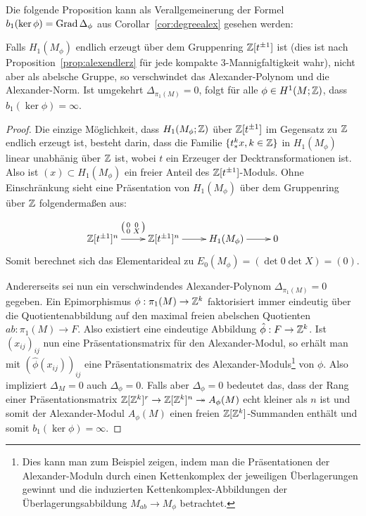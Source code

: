     Die folgende Proposition kann als Verallgemeinerung der Formel $b_1(\ker\phi)=\operatorname{Grad}\Delta_\phi$ aus Corollar~\ref{cor:degreealex} gesehen werden:
    \begin{prop}
    	Falls $H_1(M_\phi)$ endlich erzeugt über dem Gruppenring $\mathbb{Z}[t^{\pm 1}]$ ist (dies ist nach Proposition~\ref{prop:alexendlerz} für jede kompakte 3-Mannigfaltigkeit wahr), nicht aber als abelsche Gruppe, so verschwindet das Alexander-Polynom und die Alexander-Norm. Ist umgekehrt $\Delta_{\pi_1(M)}=0$, folgt für alle $\phi\in H^1(M;\mathbb{Z})$, dass $b_1(\ker\phi)=\infty$.
    \end{prop}
    \begin{proof}
    	Die einzige Möglichkeit, dass $H_1(M_\phi;\mathbb{Z})$ über $\mathbb{Z}[t^{\pm 1}]$ im Gegensatz zu $\mathbb{Z}$ endlich erzeugt ist, besteht darin, dass die Familie $\{t_*^kx,k\in\mathbb{Z}\}$ in $H_1(M_\phi)$ linear unabhänig über $\mathbb{Z}$ ist, wobei $t$ ein Erzeuger der Decktransformationen ist. Also ist $(x)\subset H_1(M_\phi)$ ein freier Anteil des $\mathbb{Z}[t^{\pm 1}]$-Moduls. Ohne Einschränkung sieht eine Präsentation von $H_1(M_\phi)$ über dem Gruppenring über $\mathbb{Z}$ folgendermaßen aus:
    	\[
    		\begin{xy}
    			\xymatrix@L+3pt{\laurent \ZZ t ^n \ar[r]^{\bigl(\begin{smallmatrix}0&0\\0&X\end{smallmatrix}\bigr)} & \laurent \ZZ t ^n \ar[r] &H_1(M_\phi) \ar[r] &0}
    		\end{xy}
    	\]
    	Somit berechnet sich das Elementarideal zu $E_0(M_\phi)=(\det 0\det X)=(0)$.%

    	Andererseits sei nun ein verschwindendes Alexander-Polynom $\Delta_{\pi_1(M)}=0$ gegeben. Ein Epimorphismus $\phi: \pi_1(M) \to \mathbb{Z}^k$ faktorisiert immer eindeutig über die Quotientenabbildung auf den maximal freien abelschen Quotienten $ab:\pi_1(M) \to F$. Also existiert eine eindeutige Abbildung $\hat \phi: F \to \mathbb{Z}^k$. Ist  $(x_{ij})_{ij}$ nun eine Präsentationsmatrix für den Alexander-Modul, so erhält man mit $(\hat \phi(x_{ij}))_{ij}$ eine Präsentationsmatrix des Alexander-Moduls\footnote{Dies kann man zum Beispiel zeigen, indem man die Präsentationen der Alexander-Moduln durch einen Kettenkomplex der jeweiligen Überlagerungen gewinnt und die induzierten Kettenkomplex-Abbildungen der Überlagerungsabbildung $M_{ab} \to M_\phi $ betrachtet.} von $\phi$. Also impliziert $\Delta_M=0$ auch $\Delta_\phi=0$. Falls aber $\Delta_\phi=0$ bedeutet das, dass der Rang einer Präsentationsmatrix $\mathbb{Z}[\mathbb{Z}^k]^r \to \mathbb{Z}[\mathbb{Z}^k]^n \twoheadrightarrow A_\phi(M)$ echt kleiner als $n$ ist und somit der Alexander-Modul $A_\phi(M)$ einen freien $\mathbb{Z}[\mathbb{Z}^k]$-Summanden enthält und somit $b_1(\ker\phi)=\infty$. 
    \end{proof}

